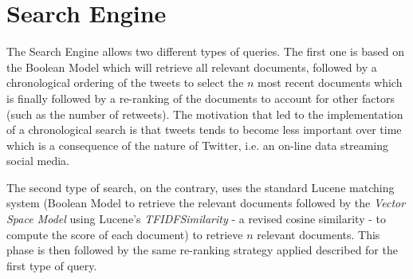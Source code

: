 \section{Search Engine}
The Search Engine allows two different types of queries. The first one is based on the Boolean Model which will retrieve all relevant documents, followed by a chronological ordering of the tweets to select the $n$ most recent documents which is finally followed by a re-ranking of the documents to account for other factors (such as the number of retweets). The motivation that led to the implementation of a chronological search is that tweets tends to become less important over time which is a consequence of the nature of Twitter, i.e. an on-line data streaming social media.

The second type of search, on the contrary, uses the standard Lucene matching system (Boolean Model to retrieve the relevant documents followed by the \textit{Vector Space Model} using Lucene's \textit{TFIDFSimilarity} - a revised cosine similarity - to compute the score of each document) to retrieve $n$ relevant documents. This phase is then followed by the same re-ranking strategy applied described for the first type of query.


